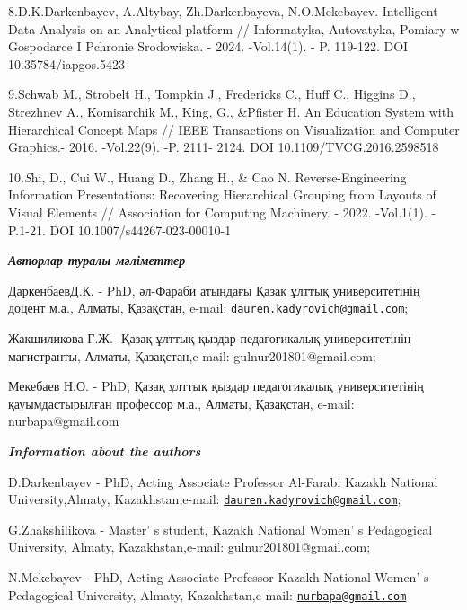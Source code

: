 \begin{references}
8.D.K.Darkenbayev, A.Altybay, Zh.Darkenbayeva, N.O.Mekebayev.
Intelligent Data Analysis on an Analytical platform // Informatyka,
Autovatyka, Pomiary w Gospodarce I Pchronie Srodowiska. - 2024.
-Vol.14(1). - P. 119-122. DOI 10.35784/iapgos.5423

9.Schwab M., Strobelt H., Tompkin J., Fredericks C., Huff C., Higgins
D., Strezhnev A., Komisarchik M., King, G., \&Pfister H. An Education
System with Hierarchical Concept Maps // IEEE Transactions on
Visualization and Computer Graphics.- 2016. -Vol.22(9). -P. 2111- 2124.
DOI 10.1109/TVCG.2016.2598518

10.\emph{S}hi, D., Cui W., Huang D., Zhang H., \& Cao N.
Reverse-Engineering Information Presentations: Recovering Hierarchical
Grouping from Layouts of Visual Elements // Association for Computing
Machinery. - 2022. -Vol.1(1). - P.1-21. DOI 10.1007/s44267-023-00010-1
\end{references}

\begin{authorinfo}
\hspace{1em}\emph{{\bfseries Авторлар туралы мәліметтер}}

ДаркенбаевД.К. - PhD, әл-Фараби атындағы Қазақ ұлттық университетінің
доцент м.а., Алматы, Қазақстан, e-mail:
\href{mailto:dauren.kadyrovich@gmail.com}{\nolinkurl{dauren.kadyrovich@gmail.com}};

Жакшиликова Г.Ж. -Қазақ ұлттық қыздар педагогикалық университетінің
магистранты, Алматы, Қазақстан,e-mail: gulnur201801@gmail.com;

Мекебаев Н.О. - PhD, Қазақ ұлттық қыздар педагогикалық университетінің
қауымдастырылған профессор м.а., Алматы, Қазақстан, e-mail:
nurbapa@gmail.com

\hspace{1em}\emph{{\bfseries Information about the authors}}

D.Darkenbayev - PhD, Acting Associate Professor Al-Farabi Kazakh
National University,Almaty, Kazakhstan,e-mail:
\href{mailto:dauren.kadyrovich@gmail.com}{\nolinkurl{dauren.kadyrovich@gmail.com}};

G.Zhakshilikova - Master' s student, Kazakh National
Women' s Pedagogical University, Almaty,
Kazakhstan,e-mail: gulnur201801@gmail.com;

N.Mekebayev - PhD, Acting Associate Professor Kazakh National
Women' s Pedagogical University, Almaty,
Kazakhstan,e-mail:
\href{mailto:nurbapa@gmail.com}{\nolinkurl{nurbapa@gmail.com}}
\end{authorinfo}
